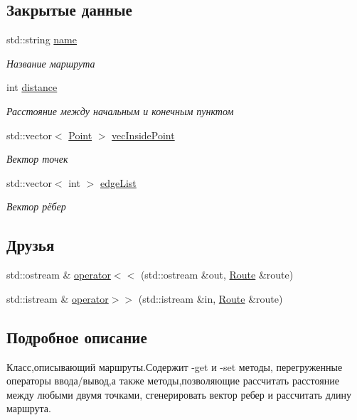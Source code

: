 \subsection*{Закрытые данные}
\begin{DoxyCompactItemize}
\item 
std\+::string \hyperlink{class_route_a892cceaead1c1602577ddfa5f9b1df32}{name}
\begin{DoxyCompactList}\small\item\em Название маршрута \end{DoxyCompactList}\item 
int \hyperlink{class_route_a29e1ec576b2d6a5b4281b414f11e6bc6}{distance}
\begin{DoxyCompactList}\small\item\em Расстояние между начальным и конечным пунктом \end{DoxyCompactList}\item 
std\+::vector$<$ \hyperlink{class_point}{Point} $>$ \hyperlink{class_route_a5b26e655044d222f569daf4639c8ff48}{vec\+Inside\+Point}
\begin{DoxyCompactList}\small\item\em Вектор точек \end{DoxyCompactList}\item 
std\+::vector$<$ int $>$ \hyperlink{class_route_a9eb67e4bd0e29d2a53fa20aba73beaa8}{edge\+List}
\begin{DoxyCompactList}\small\item\em Вектор рёбер \end{DoxyCompactList}\end{DoxyCompactItemize}
\subsection*{Друзья}
\begin{DoxyCompactItemize}
\item 
std\+::ostream \& \hyperlink{class_route_afb23c44ff142a18cd627d884caadb52f}{operator$<$$<$} (std\+::ostream \&out, \hyperlink{class_route}{Route} \&route)
\item 
std\+::istream \& \hyperlink{class_route_a4426233b29de8e20699f267f8d4460e9}{operator$>$$>$} (std\+::istream \&in, \hyperlink{class_route}{Route} \&route)
\end{DoxyCompactItemize}


\subsection{Подробное описание}
Класс,описывающий маршруты.\+Содержит -\/get и -\/set методы, перегруженные операторы ввода/вывод,а также методы,позволяющие рассчитать расстояние между любыми двумя точками, сгенерировать вектор ребер и рассчитать длину маршрута. 


